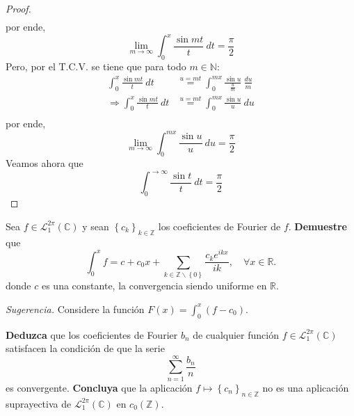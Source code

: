 \documentclass[12pt]{report}
\theoremstyle{largebreak}
\begin{document}
\begin{proof}
\begin{equation*}
\begin{split}
            \end{split}
        \end{equation*}
        por ende,
        \begin{equation*}
            \lim_{m\rightarrow\infty}\int_{0}^{x}\frac{\sin mt}{t}\:dt=\frac{\pi}{2}
        \end{equation*}
        Pero, por el T.C.V. se tiene que para todo $m\in\mathbb{N}$:
        \begin{equation*}
            \begin{split}
                \int_{0}^{x}\frac{\sin mt}{t}\:dt&\overset{u=mt}{=} \int_{0}^{mx}\frac{\sin u}{\frac{u}{m}}\: \frac{du}{m}\\
                \Rightarrow \int_{0}^{x}\frac{\sin mt}{t}\:dt&\overset{u=mt}{=} \int_{0}^{mx}\frac{\sin u}{u}\: du\\
            \end{split}
        \end{equation*}
        por ende,
        \begin{equation*}
            \lim_{m\rightarrow\infty}\int_{0}^{mx}\frac{\sin u}{u}\: du=\frac{\pi}{2}
        \end{equation*}
        Veamos ahora que
        \begin{equation*}
            \int_{0}^{\rightarrow\infty}\frac{\sin t}{t}\:dt=\frac{\pi}{2}
        \end{equation*}
    \end{proof}

    \begin{excer}
        Sea $f\in\mathcal{L}_1^{2\pi}(\mathbb{C})$ y sean $\left\{c_k \right\}_{ k\in\mathbb{Z}}$ los coeficientes de Fourier de $f$. \textbf{Demuestre} que
        \begin{equation*}
            \int_0^x f=c+c_0x+\sum_{ k\in\mathbb{Z}\backslash\left\{0\right\}}\frac{c_ke^{ ikx}}{ik},\quad\forall x\in\mathbb{R}.
        \end{equation*}
        donde $c$ es una constante, la convergencia siendo uniforme en $\mathbb{R}$.

        \textit{Sugerencia.} Considere la función $F(x)=\int_0^x (f-c_0)$.

        \textbf{Deduzca} que los coeficientes de Fourier $b_n$ de cualquier función $f\in\mathcal{L}_1^{2\pi}(\mathbb{C})$ satisfacen la condición de que la serie
        \begin{equation*}
            \sum_{ n=1}^\infty\frac{b_n}{n}
        \end{equation*}
        es convergente. \textbf{Concluya} que la aplicación $f\mapsto\left\{c_n \right\}_{ n\in\mathbb{Z}}$ no es una aplicación suprayectiva de $\mathcal{L}_1^{2\pi}(\mathbb{C})$ en $c_0(\mathbb{Z})$.
    \end{excer}
\end{document}
